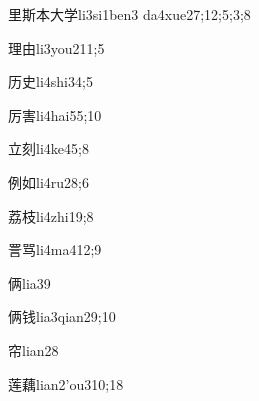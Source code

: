 \begin{verbete}{里斯本大学}{li3si1ben3 da4xue2}{7;12;5;3;8}
\end{verbete}

\begin{verbete}{理由}{li3you2}{11;5}
\end{verbete}

\begin{verbete}{历史}{li4shi3}{4;5}
\end{verbete}

\begin{verbete}{厉害}{li4hai5}{5;10}
\end{verbete}

\begin{verbete}{立刻}{li4ke4}{5;8}
\end{verbete}

\begin{verbete}{例如}{li4ru2}{8;6}
\end{verbete}

\begin{verbete}{荔枝}{li4zhi1}{9;8}
\end{verbete}

\begin{verbete}{詈骂}{li4ma4}{12;9}
\end{verbete}

\begin{verbete}{俩}{lia3}{9}
\end{verbete}

\begin{verbete}{俩钱}{lia3qian2}{9;10}
\end{verbete}

\begin{verbete}{帘}{lian2}{8}
\end{verbete}

\begin{verbete}{莲藕}{lian2'ou3}{10;18}
\end{verbete}

